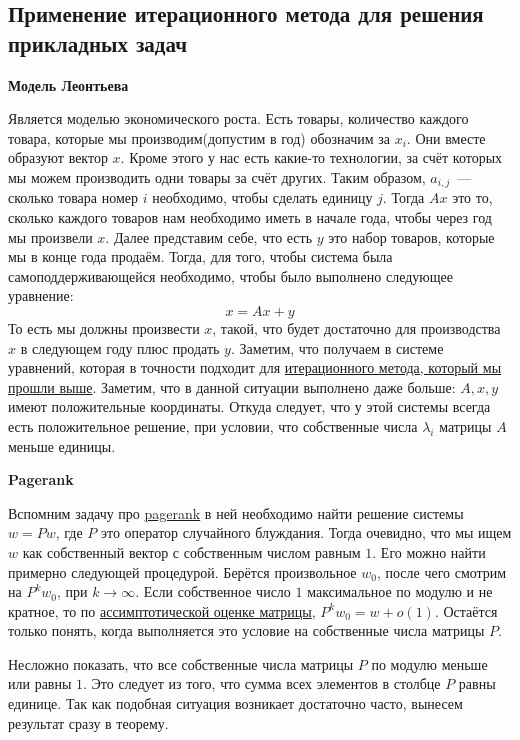 \subsection{Применение итерационного метода для решения прикладных задач}
\textbf{Модель Леонтьева}

Является моделью экономического роста. Есть товары, количество каждого товара, которые
мы производим(допустим в год) обозначим за $x_i$. Они вместе образуют вектор $x$.
Кроме этого у нас есть какие-то технологии, за счёт которых мы можем производить одни
товары за счёт других. Таким образом, $a_{i,j}$~--- сколько товара номер $i$ необходимо, чтобы сделать
единицу $j$. Тогда $Ax$ это то, сколько каждого товаров нам необходимо иметь в начале года,
чтобы через год мы произвели $x$. Далее представим себе, что есть $y$ это набор товаров,
которые мы в конце года продаём. Тогда, для того, чтобы система была самоподдерживающейся
необходимо, чтобы было выполнено следующее уравнение:
\[
    x = Ax + y
\] 
То есть мы должны произвести $x$, такой, что будет достаточно для производства $x$
в следующем году плюс продать $y$. Заметим, что получаем в системе уравнений, которая
в точности подходит для \hyperref[stm:Итерационный метод решения системы линейных уравнений]
{итерационного метода, который мы прошли выше}.
Заметим, что в данной ситуации выполнено даже больше: $A, x, y$ имеют положительные координаты.
Откуда следует, что у этой системы всегда есть положительное решение, при условии, что 
собственные числа $\lambda_i$ матрицы $A$ меньше единицы.

\textbf{Pagerank}

Вспомним задачу про \hyperref[fix:pagerank]{pagerank} в ней необходимо найти 
решение системы $w = Pw$, где $P$ это оператор случайного блуждания. Тогда очевидно,
что мы ищем $w$ как собственный вектор с собственным числом равным $1$. Его можно найти
примерно следующей процедурой. Берётся произвольное $w_0$, после чего смотрим на
$P^kw_0$, при $k\to \infty$. Если собственное число $1$ максимальное по модулю
и не кратное, то по \hyperref[stm:Ассимптотическая оценка элементов матрицы]
{ассимптотической оценке матрицы}, $P^k w_0 = w + o(1)$. Остаётся только понять, когда
выполняется это условие на собственные числа матрицы $P$.

Несложно показать, что все собственные числа матрицы $P$ по модулю меньше или равны $1$.
Это следует из того, что сумма всех элементов в столбце $P$ равны единице. Так как 
подобная ситуация возникает достаточно часто, вынесем результат сразу в теорему.

